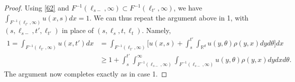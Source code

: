 \documentclass[10pt,a4paper]{amsart}
\newcommand{\F}{F}
\newcommand{\R}{{\mathbb R}}
\newcommand{\iy}{\infty}
\begin{document}
\begin{proof}
Using \eqref{62} and $\F^{-1}(\ell_{s-},\iy)\subset \F^{-1}(\ell_{t'},\iy)$,
we have $\int_{\F^{-1}(\ell_{t'},\iy)} u(x,s)dx=1$.
We can thus repeat the argument above in 1, with
$(s,\ell_{s-},t',\ell_{t'})$ in place of $(s,\ell_s,t,\ell_t)$.
Namely,
\begin{align*}
1=\int_{\F^{-1}(\ell_{t'},\iy)} u(x,t')dx&=\int_{\F^{-1}(\ell_{t'},\iy)} \Big[u(x,s)
+\int_s^{t'}\int_{\R^d} u(y,\theta)\rho(y,x)dy d\theta \Big]dx\\
&\ge
1 +\int_s^{t'}\int_{\F^{-1}(\ell_{s-},\iy)}^\iy\int_{\F^{-1}(\ell_{s-},\iy)} u(y,\theta)\rho(y,x)dy dx d\theta.
\end{align*}
The argument now completes exactly as in case 1.
\end{proof}
\end{document}
